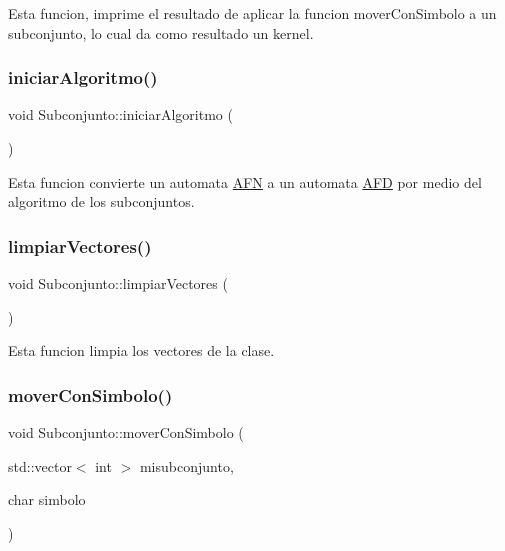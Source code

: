 Esta funcion, imprime el resultado de aplicar la funcion mover\+Con\+Simbolo a un subconjunto, lo cual da como resultado un kernel. \mbox{\label{class_subconjunto_aa8b327da2cfd9c8fb1d0b42edc737322}} 
\subsubsection{\texorpdfstring{iniciar\+Algoritmo()}{iniciarAlgoritmo()}}
{\footnotesize\ttfamily void Subconjunto\+::iniciar\+Algoritmo (\begin{DoxyParamCaption}{ }\end{DoxyParamCaption})}

Esta funcion convierte un automata \hyperlink{class_a_f_n}{A\+FN} a un automata \hyperlink{class_a_f_d}{A\+FD} por medio del algoritmo de los subconjuntos. \mbox{\label{class_subconjunto_abab1a98d217cac674ceed298af7c88f0}} 
\subsubsection{\texorpdfstring{limpiar\+Vectores()}{limpiarVectores()}}
{\footnotesize\ttfamily void Subconjunto\+::limpiar\+Vectores (\begin{DoxyParamCaption}{ }\end{DoxyParamCaption})}

Esta funcion limpia los vectores de la clase. \mbox{\label{class_subconjunto_a790de92fb9aa30b0a93f280d33332fc5}} 
\subsubsection{\texorpdfstring{mover\+Con\+Simbolo()}{moverConSimbolo()}}
{\footnotesize\ttfamily void Subconjunto\+::mover\+Con\+Simbolo (\begin{DoxyParamCaption}\item[{std\+::vector$<$ int $>$}]{misubconjunto,  }\item[{char}]{simbolo }\end{DoxyParamCaption})}

